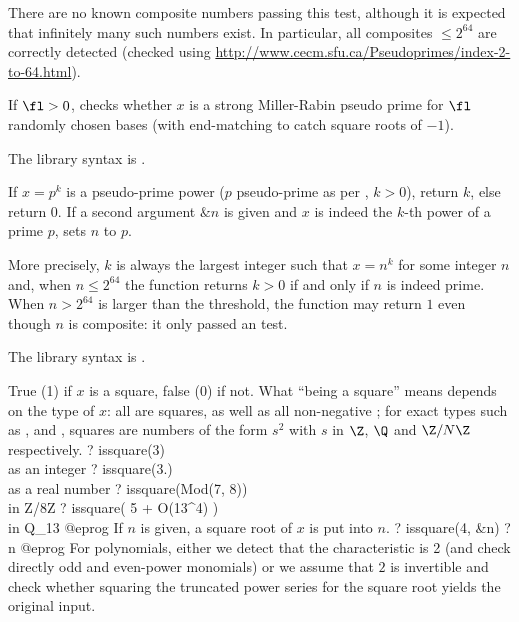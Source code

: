 There are no known composite numbers passing this test, although it is
expected that infinitely many such numbers exist. In particular, all
composites $\leq 2^{64}$ are correctly detected (checked using
\url{http://www.cecm.sfu.ca/Pseudoprimes/index-2-to-64.html}).

If $\fl > 0$, checks whether $x$ is a strong Miller-Rabin pseudo prime  for
$\fl$ randomly chosen bases (with end-matching to catch square roots of $-1$).

The library syntax is .

\label{se:ispseudoprimepower}
If $x = p^k$ is a pseudo-prime power ($p$ pseudo-prime as per
, $k > 0$), return $k$, else
return 0. If a second argument $\&n$ is given and $x$ is indeed
the $k$-th power of a prime $p$, sets $n$ to $p$.

More precisely, $k$ is always the largest integer such that $x = n^k$ for
some integer $n$ and, when $n \leq  2^{64}$ the function returns $k > 0$ if and
only if $n$ is indeed prime. When $n > 2^{64}$ is larger than the threshold,
the function may return $1$ even though $n$ is composite: it only passed
an  test.

The library syntax is .

\label{se:issquare}
True (1) if $x$ is a square, false (0)
if not. What ``being a square'' means depends on the type of $x$: all
 are squares, as well as all non-negative ; for
exact types such as ,  and , squares are
numbers of the form $s^2$ with $s$ in $\Z$, $\Q$ and $\Z/N\Z$ respectively.
\bprog
? issquare(3)          \\ as an integer
? issquare(3.)         \\ as a real number
? issquare(Mod(7, 8))  \\ in Z/8Z
? issquare( 5 + O(13^4) )  \\ in Q_13
@eprog
If $n$ is given, a square root of $x$ is put into $n$.
\bprog
? issquare(4, &n)
? n
@eprog
For polynomials, either we detect that the characteristic is 2 (and check
directly odd and even-power monomials) or we assume that $2$ is invertible
and check whether squaring the truncated power series for the square root
yields the original input.

